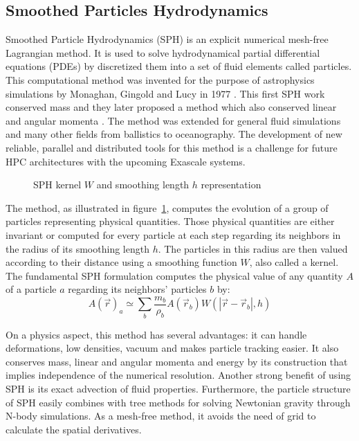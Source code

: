 \subsection{Smoothed Particles Hydrodynamics}
\label{sec:intro_sph}
Smoothed Particle Hydrodynamics (SPH) is an explicit numerical mesh-free Lagrangian method.
It is used to solve hydrodynamical partial differential equations (PDEs) by discretized them into a set of fluid elements called particles. 
This computational method was invented for the purpose of astrophysics simulations by Monaghan, Gingold and Lucy in 1977 \cite{lucy1977numerical,gingold1977smoothed}. 
This first SPH work conserved mass and they later proposed a method which also conserved linear and angular momenta \cite{gingold1982kernel}. 
The method was extended for general fluid simulations and many other fields from ballistics to oceanography.
The development of new reliable, parallel and distributed tools for this method is a challenge for future HPC architectures with the upcoming Exascale systems.

%
\begin{figure}
\centering

\caption{SPH kernel $W$ and smoothing length $h$ representation}
\label{fig:sph_base}
\end{figure}
%
The method, as illustrated in figure~\ref{fig:sph_base}, computes the evolution of a group of particles representing physical quantities.
Those physical quantities are either invariant or computed for every particle at each step regarding its neighbors in the radius of its smoothing length $h$. 
The particles in this radius are then valued according to their distance using a smoothing function $W$, also called a kernel. 
The fundamental SPH formulation computes the physical value of any quantity $A$ of a particle $a$ regarding its neighbors’ particles $b$ by:
\begin{equation}
A(\vec{r})_a \simeq \sum_b \frac{m_b}{\rho_b} A(\vec{r}_b) W ( |\vec{r}-\vec{r}_b|,h)
\end{equation}

On a physics aspect, this method has several advantages:
it can handle deformations, low densities, vacuum and makes particle tracking easier. 
It also conserves mass, linear and angular momenta and energy by its construction that implies independence of the numerical resolution. 
Another strong benefit of using SPH is its exact advection of fluid properties. 
Furthermore, the particle structure of SPH easily combines with tree methods for solving Newtonian gravity through N-body simulations.
As a mesh-free method, it avoids the need of grid to calculate the spatial derivatives. 

